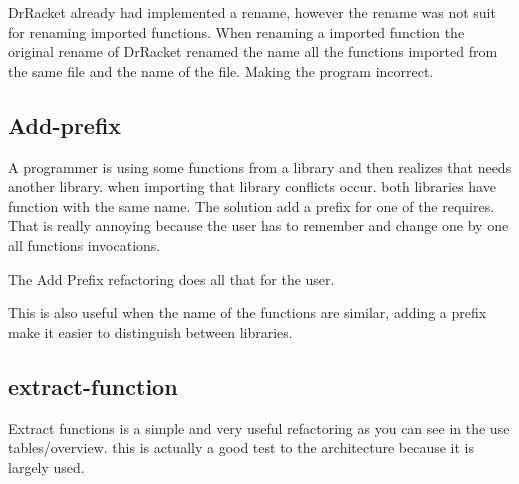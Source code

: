 DrRacket already had implemented a rename, however the rename was not suit for renaming imported functions.
When renaming a imported function the original rename of DrRacket renamed the name all the functions imported from the same file and the name of the file. 
Making the program incorrect.


\subsection{Add-prefix}
A programmer is using some functions from a library and then realizes that needs another library. when importing that library conflicts occur.
both libraries have function with the same name. The solution add a prefix for one of the requires.
That is really annoying because the user has to remember and change one by one all functions invocations.

The Add Prefix refactoring does all that for the user.

This is also useful when the name of the functions are similar, adding a prefix make it easier to distinguish between libraries.


\subsection{extract-function}

Extract functions is a simple and very useful refactoring as you can see in the use tables/overview. this is actually a good test to the architecture because it is largely used.
